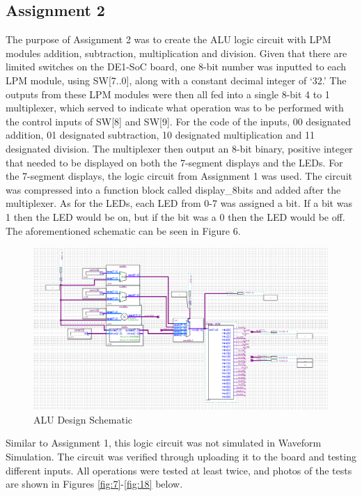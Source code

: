 \documentclass[
	letterpaper, %
	10pt, %
]{CSUniSchoolLabReport}
\begin{document}
\subsection{Assignment 2}

\hspace{.5 in} The purpose of Assignment 2 was to create the ALU logic circuit with LPM modules addition, subtraction, multiplication and division. Given that there are limited switches on the DE1-SoC board, one 8-bit number was inputted to each LPM module, using SW[7..0], along with a constant decimal integer of ‘32.’ The outputs from these LPM modules were then all fed into a single 8-bit 4 to 1 multiplexer, which served to indicate what operation was to be performed with the control inputs of SW[8] and SW[9]. For the code of the inputs, 00 designated addition, 01 designated subtraction, 10 designated multiplication and 11 designated division. The multiplexer then output an 8-bit binary, positive integer that needed to be displayed on both the 7-segment displays and the LEDs. For the 7-segment displays, the logic circuit from Assignment 1 was used. The circuit was compressed into a function block called display\_8bits and added after the multiplexer. As for the LEDs, each LED from 0-7 was assigned a bit. If a bit was 1 then the LED would be on, but if the bit was a 0 then the LED would be off. The aforementioned schematic can be seen in Figure 6. 

\begin{figure}[H]
  \centering
  \includegraphics[width=.9\textwidth]{Figures/ALUDesign.png}
  \caption{ALU Design Schematic}
  \label{fig:6}
\end{figure}

\hspace{.5 in} Similar to Assignment 1, this logic circuit was not simulated in Waveform Simulation. The circuit was verified through uploading it to the board and testing different inputs. All operations were tested at least twice, and photos of the tests are shown in Figures \ref{fig:7}-\ref{fig:18} below.
\end{document}
